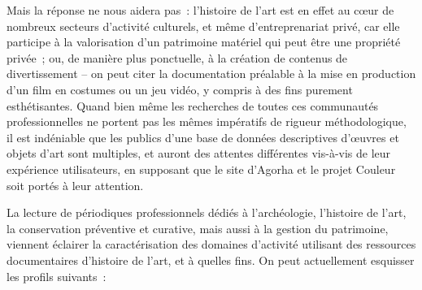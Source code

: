 \documentclass[a4paper,12pt, twoside]{book}
\begin{document}
Mais la réponse ne nous aidera pas~: l’histoire de l’art est en effet au cœur de nombreux secteurs d’activité culturels, et même d’entreprenariat privé, car elle participe à la valorisation d’un patrimoine matériel qui peut être une propriété privée~; ou, de manière plus ponctuelle, à la création de contenus de divertissement – on peut citer la documentation préalable à la mise en production d’un film en costumes ou un jeu vidéo, y compris à des fins purement esthétisantes. Quand bien même les recherches de toutes ces communautés professionnelles ne portent pas les mêmes impératifs de rigueur méthodologique, il est indéniable que les publics d’une base de données descriptives d’œuvres et objets d’art sont multiples, et auront des attentes différentes vis-à-vis de leur expérience utilisateurs, en supposant que le site d’Agorha et le projet Couleur soit portés à leur attention.

La lecture de périodiques professionnels dédiés à l’archéologie, l’histoire de l’art, la conservation préventive et curative, mais aussi à la gestion du patrimoine, viennent éclairer la caractérisation des domaines d’activité utilisant des ressources documentaires d’histoire de l’art, et à quelles fins. On peut actuellement esquisser les profils suivants~:
\end{document}
